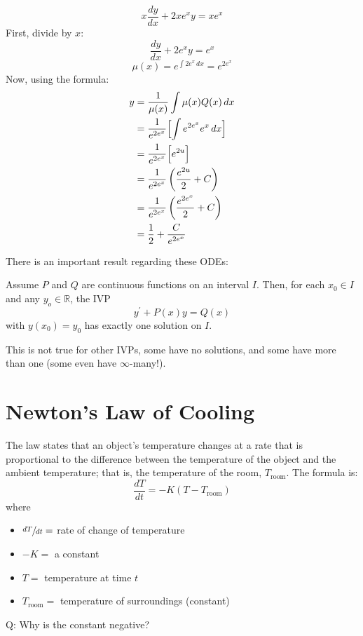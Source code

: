 \begin{Example}{}{}
    \[ x \frac{dy}{dx} +2xe^x y=xe^x \]
    First, divide by $ x $:
    \[ \frac{dy}{dx}+2e^x y=e^x \]
    \[ \mu(x)=e^{\int 2e^x\, d{x}}=e^{2e^x} \]
    Now, using the formula:
    \begin{align*}
        y
         & =\frac{1}{\mu(x)}\int \mu(x)Q(x)\, d{x}                 \\
         & =\frac{1}{e^{2e^x}}\Bigl[\int e^{2e^x}e^x\, d{x} \Bigr] \\
         & =\frac{1}{e^{2e^x}} \Bigl[e^{2u}\Bigr]                  \\
         & =\frac{1}{e^{2e^x}}\left( \frac{e^{2u}}{2} +C \right)   \\
         & =\frac{1}{e^{2e^x}}\left( \frac{e^{2e^x}}{2} +C \right) \\
         & =\frac{1}{2} +\frac{C}{e^{2e^x}}
    \end{align*}
\end{Example}

There is an important result regarding these ODEs:
\begin{Theorem}{}{}
    Assume $ P $ and $ Q $ are continuous functions on an interval $ I $.
    Then, for each $ x_0\in I $ and any $ y_o\in\mathbb{R} $, the IVP
    \[ y^\prime +P(x)y=Q(x) \]
    with $ y(x_0)=y_0 $ has exactly one solution on $ I $.
\end{Theorem}

\begin{Remark}{}{}
    This is not true for other IVPs, some have no solutions, and some have more than
    one (some even have $ \infty $-many!).
\end{Remark}

\setcounter{section}{6}
\section{Newton's Law of Cooling}
The law states that an object's temperature changes at a rate that is proportional
to the difference between the temperature of
the object and the ambient temperature; that is, the temperature of the room,
$ T_{\text{room}} $. The formula is:
\[ \frac{dT}{dt}=-K\left( T-T_{\text{room}} \right)  \]
where
\begin{itemize}
    \item $ \sfrac{dT}{dt} = $ rate of change of temperature
    \item $ -K =$ a constant
    \item $ T= $ temperature at time $ t $
    \item $ T_{\text{room}}= $ temperature of surroundings (constant)
\end{itemize}
Q\@: Why is the constant negative?

